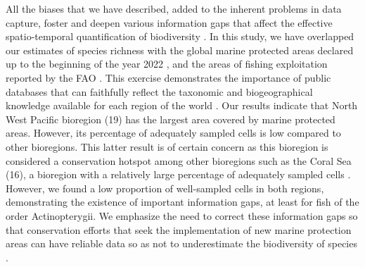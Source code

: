 \documentclass[12pt,authoryear]{elsarticle}
\begin{document}
All the biases that we have described, added to the inherent problems in data capture, foster and deepen various information gaps that affect the effective spatio-temporal quantification of biodiversity \citep{magurran2011}. In this study, we have overlapped our estimates of species richness with the global marine protected areas declared up to the beginning of the year 2022 \citep{wcmc2022}, and the areas of fishing exploitation reported by the FAO \citep{fao2014}. This exercise demonstrates the importance of public databases that can faithfully reflect the taxonomic and biogeographical knowledge available for each region of the world \citep{pelayo2018}.
%
Our results indicate that North West Pacific bioregion (19) has the largest area covered by marine protected areas. However, its percentage of adequately sampled cells is low compared to other bioregions. This latter result is of certain concern as this bioregion is considered a conservation hotspot among other bioregions such as the Coral Sea (16), a bioregion with a relatively large  percentage of adequately sampled cells \citep{ramirez2017climate}. 
%
However, we found a low proportion of well-sampled cells in both regions, demonstrating the existence of important information gaps, at least for fish of the order Actinopterygii. We emphasize the need to correct these information gaps so that conservation efforts that seek the implementation of new marine protection areas can have reliable data so as not to underestimate the biodiversity of species \citep{sala2021}.
\end{document}
